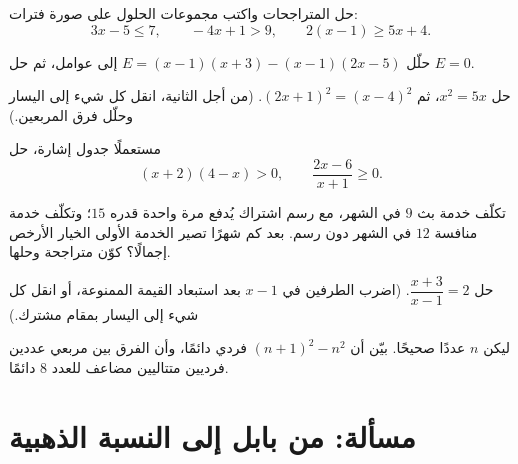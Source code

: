 \begin{exercise}[$\star$]\label{exo:g10:algebra:5}
حل المتراجحات واكتب مجموعات الحلول على صورة فترات:
\[
3x - 5 \leq 7, \qquad
-4x + 1 > 9, \qquad
2(x - 1) \geq 5x + 4 .
\]
\end{exercise}

\begin{exercise}[$\star\star$]\label{exo:g10:algebra:6}
حلّل $E = (x - 1)(x + 3) - (x - 1)(2x - 5)$ إلى عوامل، ثم حل $E = 0$.
\end{exercise}

\begin{exercise}[$\star\star$]\label{exo:g10:algebra:7}
حل $x^2 = 5x$، ثم $(2x + 1)^2 = (x - 4)^2$. (من أجل الثانية،
انقل كل شيء إلى اليسار وحلّل فرق المربعين.)
\end{exercise}

\begin{exercise}[$\star\star$]\label{exo:g10:algebra:8}
مستعملًا جدول إشارة، حل
\[
(x + 2)(4 - x) > 0,
\qquad
\frac{2x - 6}{x + 1} \geq 0 .
\]
\end{exercise}

\begin{exercise}[$\star\star$]\label{exo:g10:algebra:9}
تكلّف خدمة بث $9$ في الشهر، مع رسم اشتراك يُدفع مرة واحدة قدره
$15$؛ وتكلّف خدمة منافسة $12$ في الشهر دون رسم. بعد كم شهرًا
تصير الخدمة الأولى الخيار الأرخص إجمالًا؟ كوّن متراجحة وحلها.
\end{exercise}

\begin{exercise}[$\star\star$]\label{exo:g10:algebra:10}
حل $\dfrac{x+3}{x-1} = 2$. (اضرب الطرفين في $x - 1$ بعد
استبعاد القيمة الممنوعة، أو انقل كل شيء إلى اليسار بمقام
مشترك.)
\end{exercise}

\begin{exercise}[$\star\star\star$]\label{exo:g10:algebra:11}
ليكن $n$ عددًا صحيحًا. بيّن أن $(n + 1)^2 - n^2$ فردي دائمًا، وأن
الفرق بين مربعي عددين فرديين متتاليين مضاعف للعدد $8$
دائمًا.
\end{exercise}

\section{مسألة: من بابل إلى النسبة الذهبية}

